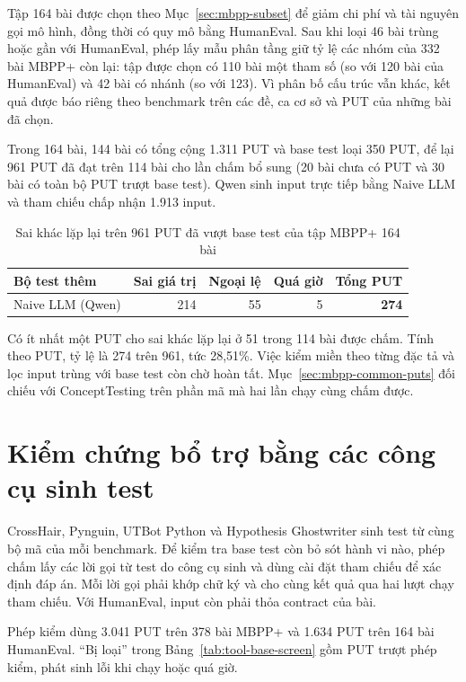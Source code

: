 Tập 164 bài được chọn theo Mục~\ref{sec:mbpp-subset} để giảm chi phí và tài nguyên gọi mô hình, đồng thời có quy mô bằng HumanEval. Sau khi loại 46 bài trùng hoặc gần với HumanEval, phép lấy mẫu phân tầng giữ tỷ lệ các nhóm của 332 bài MBPP+ còn lại: tập được chọn có 110 bài một tham số (so với 120 bài của HumanEval) và 42 bài có nhánh (so với 123). Vì phân bố cấu trúc vẫn khác, kết quả được báo riêng theo benchmark trên các đề, ca cơ sở và PUT của những bài đã chọn.

Trong 164 bài, 144 bài có tổng cộng 1.311 PUT và base test loại 350 PUT, để lại 961 PUT đã đạt trên 114 bài cho lần chấm bổ sung (20 bài chưa có PUT và 30 bài có toàn bộ PUT trượt base test). Qwen sinh input trực tiếp bằng Naive LLM và tham chiếu chấp nhận 1.913 input.

\begin{table}[!htbp]
\centering
\caption{Sai khác lặp lại trên 961 PUT đã vượt base test của tập MBPP+ 164 bài}
\label{tab:mbpp-qwen-plain}
\small
\begin{tabular*}{\linewidth}{@{\extracolsep{\fill}}lrrrr@{}}
\toprule
Bộ test thêm & Sai giá trị & Ngoại lệ & Quá giờ & Tổng PUT \\
\midrule
Naive LLM (Qwen) & 214 & 55 & 5 & \textbf{274} \\
\bottomrule
\end{tabular*}
\end{table}

Có ít nhất một PUT cho sai khác lặp lại ở 51 trong 114 bài được chấm. Tính theo PUT, tỷ lệ là 274 trên 961, tức 28,51\%. Việc kiểm miền theo từng đặc tả và lọc input trùng với base test còn chờ hoàn tất. Mục~\ref{sec:mbpp-common-puts} đối chiếu với ConceptTesting trên phần mã mà hai lần chạy cùng chấm được.

\section{Kiểm chứng bổ trợ bằng các công cụ sinh test}
\label{sec:tool-aggregation}

CrossHair, Pynguin, UTBot Python và Hypothesis Ghostwriter sinh test từ cùng bộ mã của mỗi benchmark. Để kiểm tra base test còn bỏ sót hành vi nào, phép chấm lấy các lời gọi từ test do công cụ sinh và dùng cài đặt tham chiếu để xác định đáp án. Mỗi lời gọi phải khớp chữ ký và cho cùng kết quả qua hai lượt chạy tham chiếu. Với HumanEval, input còn phải thỏa contract của bài.

Phép kiểm dùng 3.041 PUT trên 378 bài MBPP+ và 1.634 PUT trên 164 bài HumanEval. ``Bị loại'' trong Bảng~\ref{tab:tool-base-screen} gồm PUT trượt phép kiểm, phát sinh lỗi khi chạy hoặc quá giờ.

